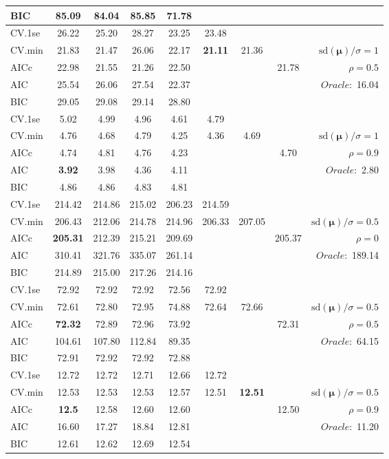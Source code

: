\begin{table}
\begin{center}
\begin{tabular}{l*{7}{c}|r}
BIC & 85.09 & 84.04 & 85.85 & 71.78 & & & &  \\
 \hline 
CV.1se & 26.22 & 25.20 & 28.27 & 23.25 & 23.48 & & & \\
CV.min & 21.83 & 21.47 & 26.06 & 22.17 & {\bf 21.11} & 21.36 & & $\mathrm{sd}(\mathbf{\mu})/\sigma=1$ \\
AICc & 22.98 & 21.55 & 21.26 & 22.50 & & & 21.78 &  $\rho=0.5$ \\
AIC & 25.54 & 26.06 & 27.54 & 22.37 & & & &  \multirow{2}{*}{$Oracle: $ 16.04} \\
BIC & 29.05 & 29.08 & 29.14 & 28.80 & & & &  \\
 \hline 
CV.1se & 5.02 & 4.99 & 4.96 & 4.61 & 4.79 & & & \\
CV.min & 4.76 & 4.68 & 4.79 & 4.25 & 4.36 & 4.69 & & $\mathrm{sd}(\mathbf{\mu})/\sigma=1$ \\
AICc & 4.74 & 4.81 & 4.76 & 4.23 & & & 4.70 &  $\rho=0.9$ \\
AIC & {\bf 3.92} & 3.98 & 4.36 & 4.11 & & & &  \multirow{2}{*}{$Oracle: $ 2.80} \\
BIC & 4.86 & 4.86 & 4.83 & 4.81 & & & &  \\
 \hline 
CV.1se & 214.42 & 214.86 & 215.02 & 206.23 & 214.59 & & & \\
CV.min & 206.43 & 212.06 & 214.78 & 214.96 & 206.33 & 207.05 & & $\mathrm{sd}(\mathbf{\mu})/\sigma=0.5$ \\
AICc & {\bf 205.31} & 212.39 & 215.21 & 209.69 & & & 205.37 &  $\rho=0$ \\
AIC & 310.41 & 321.76 & 335.07 & 261.14 & & & &  \multirow{2}{*}{$Oracle: $ 189.14} \\
BIC & 214.89 & 215.00 & 217.26 & 214.16 & & & &  \\
 \hline 
CV.1se & 72.92 & 72.92 & 72.92 & 72.56 & 72.92 & & & \\
CV.min & 72.61 & 72.80 & 72.95 & 74.88 & 72.64 & 72.66 & & $\mathrm{sd}(\mathbf{\mu})/\sigma=0.5$ \\
AICc & {\bf 72.32} & 72.89 & 72.96 & 73.92 & & & 72.31 &  $\rho=0.5$ \\
AIC & 104.61 & 107.80 & 112.84 & 89.35 & & & &  \multirow{2}{*}{$Oracle: $ 64.15} \\
BIC & 72.91 & 72.92 & 72.92 & 72.88 & & & &  \\
 \hline 
CV.1se & 12.72 & 12.72 & 12.71 & 12.66 & 12.72 & & & \\
CV.min & 12.53 & 12.53 & 12.53 & 12.57 & 12.51 & {\bf 12.51} & & $\mathrm{sd}(\mathbf{\mu})/\sigma=0.5$ \\
AICc & {\bf 12.5} & 12.58 & 12.60 & 12.60 & & & 12.50 &  $\rho=0.9$ \\
AIC & 16.60 & 17.27 & 18.84 & 12.81 & & & &  \multirow{2}{*}{$Oracle: $ 11.20} \\
BIC & 12.61 & 12.62 & 12.69 & 12.54 & & & &  \\
 \hline 
\end{tabular}
\end{center}
\vspace{-1cm}
\end{table}





